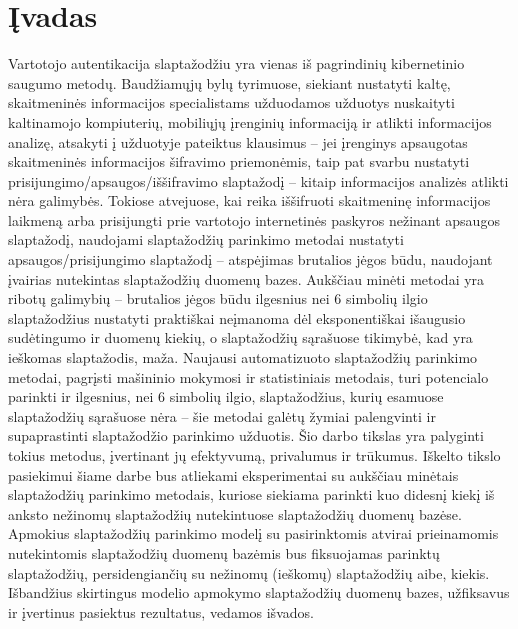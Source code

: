 \documentclass{VUMIFInfBakalaurinis}
\begin{document}
\section{Įvadas}
Vartotojo autentikacija slaptažodžiu yra vienas iš pagrindinių kibernetinio 
saugumo metodų.
Baudžiamųjų bylų tyrimuose, siekiant nustatyti kaltę, skaitmeninės informacijos 
specialistams užduodamos užduotys nuskaityti kaltinamojo kompiuterių, mobiliųjų 
įrenginių informaciją ir atlikti informacijos analizę, atsakyti į užduotyje 
pateiktus klausimus -- jei įrenginys apsaugotas skaitmeninės informacijos 
šifravimo priemonėmis, taip pat svarbu nustatyti 
prisijungimo/apsaugos/iššifravimo slaptažodį -- kitaip informacijos analizės 
atlikti nėra galimybės.
Tokiose atvejuose, kai reika iššifruoti skaitmeninę informacijos laikmeną arba 
prisijungti prie vartotojo internetinės paskyros nežinant apsaugos slaptažodį, 
naudojami slaptažodžių parinkimo metodai nustatyti apsaugos/prisijungimo 
slaptažodį -- atspėjimas brutalios jėgos būdu, naudojant įvairias nutekintas 
slaptažodžių duomenų bazes. Aukščiau minėti metodai yra ribotų galimybių -- 
brutalios jėgos būdu ilgesnius nei 6 simbolių ilgio slaptažodžius nustatyti 
praktiškai neįmanoma dėl eksponentiškai išaugusio sudėtingumo ir duomenų kiekių, 
o slaptažodžių sąrašuose tikimybė, kad yra ieškomas slaptažodis, maža.
Naujausi automatizuoto slaptažodžių parinkimo metodai, pagrįsti mašininio 
mokymosi ir statistiniais metodais, turi potencialo parinkti ir ilgesnius, nei 6 
simbolių ilgio, slaptažodžius, kurių esamuose slaptažodžių sąrašuose nėra -- šie 
metodai galėtų žymiai palengvinti ir supaprastinti slaptažodžio parinkimo 
užduotis. Šio darbo tikslas yra palyginti tokius metodus, įvertinant jų 
efektyvumą, privalumus ir trūkumus.
Iškelto tikslo pasiekimui šiame darbe bus atliekami eksperimentai su aukščiau 
minėtais slaptažodžių parinkimo metodais, kuriose siekiama parinkti kuo didesnį 
kiekį iš anksto nežinomų slaptažodžių nutekintuose slaptažodžių duomenų bazėse. 
Apmokius slaptažodžių parinkimo modelį su pasirinktomis atvirai prieinamomis 
nutekintomis slaptažodžių duomenų bazėmis bus fiksuojamas parinktų slaptažodžių, 
persidengiančių su nežinomų (ieškomų) slaptažodžių aibe, kiekis. Išbandžius 
skirtingus modelio apmokymo slaptažodžių duomenų bazes, užfiksavus ir įvertinus 
pasiektus rezultatus, vedamos išvados.
\end{document}
